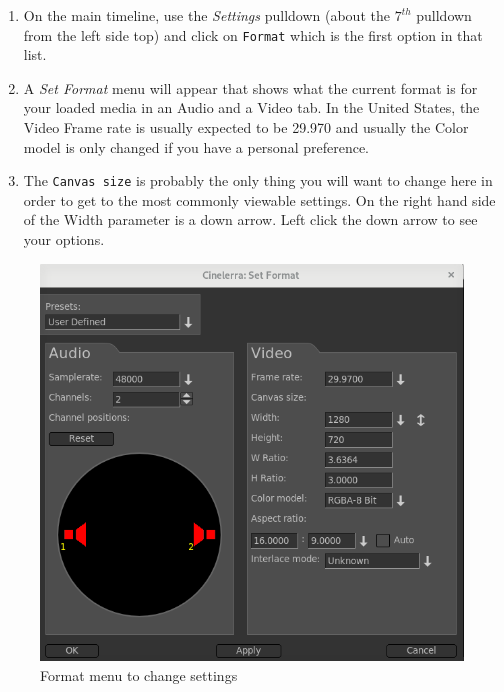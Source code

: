 \begin{enumerate}
	\item On the main timeline, use the \textit{Settings} pulldown (about the $7^{th}$ pulldown from the left side top) and
	click on \texttt{Format} which is the first option in that list.
	\item A \textit{Set Format} menu will appear that shows what the current format is for your loaded media in an
	Audio and a Video tab.  In the United States, the Video Frame rate is usually expected to be 29.970	and usually the Color model is only changed if you have a personal preference.
	\item The \texttt{Canvas size} is probably the only thing you will want to change here in order to get to the
	most commonly viewable settings.  On the right hand side of the Width parameter is a down arrow. 
	Left click the down arrow to see your options.
\end{enumerate}

\begin{figure}[htpb]
	\centering
	\includegraphics[width=0.8\linewidth]{images/format_setting.png}
	\caption{Format menu to change settings}	
\end{figure}

